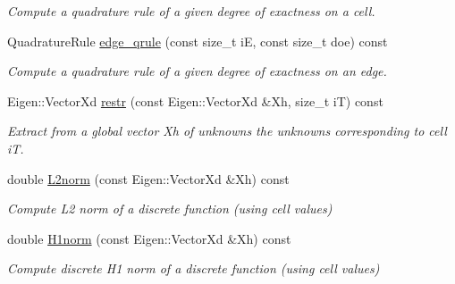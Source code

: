 \begin{DoxyCompactItemize}
\begin{DoxyCompactList}\small\item\em Compute a quadrature rule of a given degree of exactness on a cell. \end{DoxyCompactList}\item 
Quadrature\+Rule \hyperlink{classHArDCore2D_1_1HybridCore_a4158e234143fd956fd4038adf9097bc2}{edge\+\_\+qrule} (const size\+\_\+t iE, const size\+\_\+t doe) const
\begin{DoxyCompactList}\small\item\em Compute a quadrature rule of a given degree of exactness on an edge. \end{DoxyCompactList}\item 
\mbox{\label{classHArDCore2D_1_1HybridCore_a02b46a742045262030431b73eb112f9c}} 
Eigen\+::\+Vector\+Xd \hyperlink{classHArDCore2D_1_1HybridCore_a02b46a742045262030431b73eb112f9c}{restr} (const Eigen\+::\+Vector\+Xd \&Xh, size\+\_\+t iT) const
\begin{DoxyCompactList}\small\item\em Extract from a global vector Xh of unknowns the unknowns corresponding to cell iT. \end{DoxyCompactList}\item 
\mbox{\label{classHArDCore2D_1_1HybridCore_a6c2a3d4fde899dde50fda5d97eafdc07}} 
double \hyperlink{classHArDCore2D_1_1HybridCore_a6c2a3d4fde899dde50fda5d97eafdc07}{L2norm} (const Eigen\+::\+Vector\+Xd \&Xh) const
\begin{DoxyCompactList}\small\item\em Compute L2 norm of a discrete function (using cell values) \end{DoxyCompactList}\item 
\mbox{\label{classHArDCore2D_1_1HybridCore_a5962007697ffc13367070f7c4bcbe875}} 
double \hyperlink{classHArDCore2D_1_1HybridCore_a5962007697ffc13367070f7c4bcbe875}{H1norm} (const Eigen\+::\+Vector\+Xd \&Xh) const
\begin{DoxyCompactList}\small\item\em Compute discrete H1 norm of a discrete function (using cell values) \end{DoxyCompactList}\item 
\mbox{\label{classHArDCore2D_1_1HybridCore_ac8878fba08f008f5ecbaa69a9a084904}} 

\end{DoxyCompactItemize}
